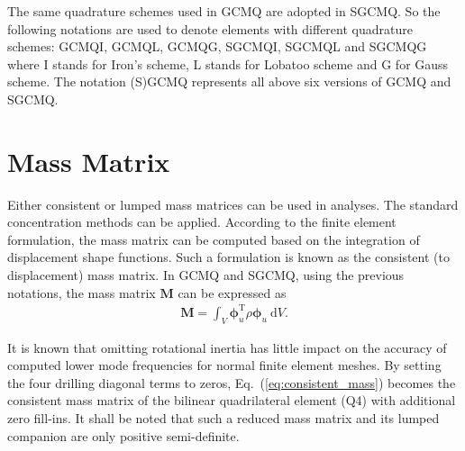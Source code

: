 \documentclass[3p,sort&compress,review,11pt,fleqn]{elsarticle}
\newcommand*{\md}[1]{\mathrm{d}#1}
\newcommand*{\mT}{\mathrm{T}}
\newcommand*{\eqsref}[1]{Eq.~(\ref{#1})}
\newcommand*{\mathbold}[1]{\bm{#1}}
\begin{document}
The same quadrature schemes used in GCMQ \citep[see][]{Chang2019a} are adopted in SGCMQ. So the following notations are used to denote elements with different quadrature schemes: GCMQI, GCMQL, GCMQG, SGCMQI, SGCMQL and SGCMQG where I stands for Iron's scheme, L stands for Lobatoo scheme and G for Gauss scheme. The notation (S)GCMQ represents all above six versions of GCMQ and SGCMQ.
\section{Mass Matrix}
Either consistent or lumped mass matrices can be used in analyses. The standard concentration methods can be applied. According to the finite element formulation, the mass matrix can be computed based on the integration of displacement shape functions. Such a formulation is known as the consistent (to displacement) mass matrix. In GCMQ and SGCMQ, using the previous notations, the mass matrix $\mathbold{M}$ can be expressed as
\begin{gather}\label{eq:consistent_mass}
\mathbold{M}=\int_{V}\mathbold{\phi}_u^\mT\rho\mathbold{\phi}_u~\md{V}.
\end{gather}

It is known that omitting rotational inertia has little impact on the accuracy of computed lower mode frequencies for normal finite element meshes. By setting the four drilling diagonal terms to zeros, \eqsref{eq:consistent_mass} becomes the consistent mass matrix of the bilinear quadrilateral element (Q4) with additional zero fill-ins. It shall be noted that such a reduced mass matrix and its lumped companion are only positive semi-definite. 
\end{document}
